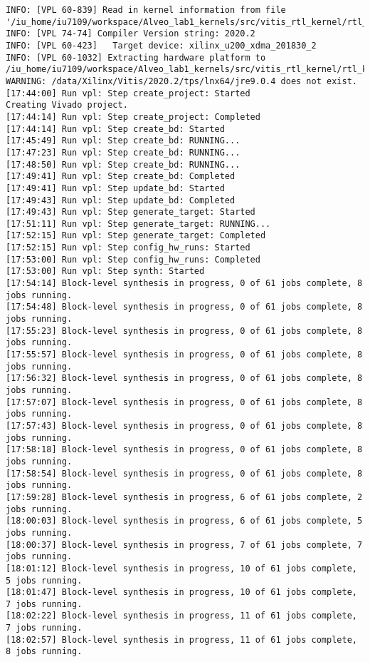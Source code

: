 \begin{center}
\begin{lstlisting}[label=lst:vlog,caption=Файл v++\_vinc.log]
INFO: [VPL 60-839] Read in kernel information from file '/iu_home/iu7109/workspace/Alveo_lab1_kernels/src/vitis_rtl_kernel/rtl_kernel_wizard_2/_x/link/int/kernel_info.dat'.
INFO: [VPL 74-74] Compiler Version string: 2020.2
INFO: [VPL 60-423]   Target device: xilinx_u200_xdma_201830_2
INFO: [VPL 60-1032] Extracting hardware platform to /iu_home/iu7109/workspace/Alveo_lab1_kernels/src/vitis_rtl_kernel/rtl_kernel_wizard_2/_x/link/vivado/vpl/.local/hw_platform
WARNING: /data/Xilinx/Vitis/2020.2/tps/lnx64/jre9.0.4 does not exist.
[17:44:00] Run vpl: Step create_project: Started
Creating Vivado project.
[17:44:14] Run vpl: Step create_project: Completed
[17:44:14] Run vpl: Step create_bd: Started
[17:45:49] Run vpl: Step create_bd: RUNNING...
[17:47:23] Run vpl: Step create_bd: RUNNING...
[17:48:50] Run vpl: Step create_bd: RUNNING...
[17:49:41] Run vpl: Step create_bd: Completed
[17:49:41] Run vpl: Step update_bd: Started
[17:49:43] Run vpl: Step update_bd: Completed
[17:49:43] Run vpl: Step generate_target: Started
[17:51:11] Run vpl: Step generate_target: RUNNING...
[17:52:15] Run vpl: Step generate_target: Completed
[17:52:15] Run vpl: Step config_hw_runs: Started
[17:53:00] Run vpl: Step config_hw_runs: Completed
[17:53:00] Run vpl: Step synth: Started
[17:54:14] Block-level synthesis in progress, 0 of 61 jobs complete, 8 jobs running.
[17:54:48] Block-level synthesis in progress, 0 of 61 jobs complete, 8 jobs running.
[17:55:23] Block-level synthesis in progress, 0 of 61 jobs complete, 8 jobs running.
[17:55:57] Block-level synthesis in progress, 0 of 61 jobs complete, 8 jobs running.
[17:56:32] Block-level synthesis in progress, 0 of 61 jobs complete, 8 jobs running.
[17:57:07] Block-level synthesis in progress, 0 of 61 jobs complete, 8 jobs running.
[17:57:43] Block-level synthesis in progress, 0 of 61 jobs complete, 8 jobs running.
[17:58:18] Block-level synthesis in progress, 0 of 61 jobs complete, 8 jobs running.
[17:58:54] Block-level synthesis in progress, 0 of 61 jobs complete, 8 jobs running.
[17:59:28] Block-level synthesis in progress, 6 of 61 jobs complete, 2 jobs running.
[18:00:03] Block-level synthesis in progress, 6 of 61 jobs complete, 5 jobs running.
[18:00:37] Block-level synthesis in progress, 7 of 61 jobs complete, 7 jobs running.
[18:01:12] Block-level synthesis in progress, 10 of 61 jobs complete, 5 jobs running.
[18:01:47] Block-level synthesis in progress, 10 of 61 jobs complete, 7 jobs running.
[18:02:22] Block-level synthesis in progress, 11 of 61 jobs complete, 7 jobs running.
[18:02:57] Block-level synthesis in progress, 11 of 61 jobs complete, 8 jobs running.

\end{lstlisting}
\end{center}
